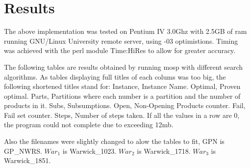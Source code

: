 \section{Results}
The above implementation was tested on Pentium IV 3.0Ghz with 2.5GB of ram
running GNU/Linux University remote server, using -03 optimistions. Timing was
achieved with the perl module Time:HiRes to allow for greater accuracy.

The following tables are results obtained by running mosp with different search
algorithms. As tables displaying full titles of each colums was too big, the
following shortened titles stand for: Instance, Instance Name.  Optimal, Proven
optimal. Parts, Partitions where each number is a partition and the number of
products in it. Subs, Subsumptions. Open, Non-Opening Products counter. Fail,
Fail set counter. Steps, Number of steps taken.  If all the values in a row are
0, the program could not complete due to exceeding 12mb.

Also the filenames were slightly changed to alow the tables to fit, GPN is
GP\_NWRS. $War_1$ is Warwick\_1023. $War_2$ is Warwick\_1718. $War_3$ is Warwick\_1851. 


